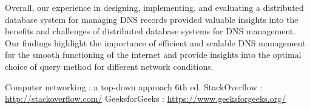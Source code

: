 \documentclass[11pt]{article}
\begin{document}
Overall, our experience in designing, implementing, and evaluating a distributed database system for managing DNS records provided valuable insights into the benefits and challenges of distributed database systems for DNS management. Our findings highlight the importance of efficient and scalable DNS management for the smooth functioning of the internet and provide insights into the optimal choice of query method for different network conditions.

\begin{thebibliography}{1}
  Computer networking : a top-down approach 6th ed.
 StackOverflow : \url{http://stackoverflow.com/}
 GeeksforGeeks : \url{https://www.geeksforgeeks.org/}
\end{thebibliography}
\end{document}
